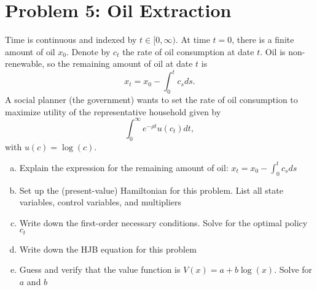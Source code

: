 \documentclass[11pt]{extarticle}
\theoremstyle{plain}
\theoremstyle{definition}
\begin{document}
\vspace{5mm}
\section*{Problem 5: Oil Extraction}

Time is continuous and indexed by $t \in [0, \infty)$. At time $t=0$, there is a finite amount of oil $x_0$. Denote by $c_t$ the rate of oil consumption at date $t$. Oil is non-renewable, so the remaining amount of oil at date $t$ is 
\begin{equation*}
	x_t = x_0 - \int_0^t c_s ds.
\end{equation*}
A social planner (the government) wants to set the rate of oil consumption to maximize utility of the representative household given by
\begin{equation*}
	\int_0^\infty e^{- \rho t} u(c_t) dt,
\end{equation*}
with $u(c) = \log(c)$. 

\vspace{2mm}
\begin{enumerate}[(a)]
\item Explain the expression for the remaining amount of oil: $x_t = x_0 - \int_0^t c_s ds$

\item Set up the (present-value) Hamiltonian for this problem. List all state variables, control variables, and multipliers

\item Write down the first-order necessary conditions. Solve for the optimal policy $c_t$

\item Write down the HJB equation for this problem

\item Guess and verify that the value function is $V(x) = a + b \log(x)$. Solve for $a$ and $b$
\end{enumerate}
\end{document}
